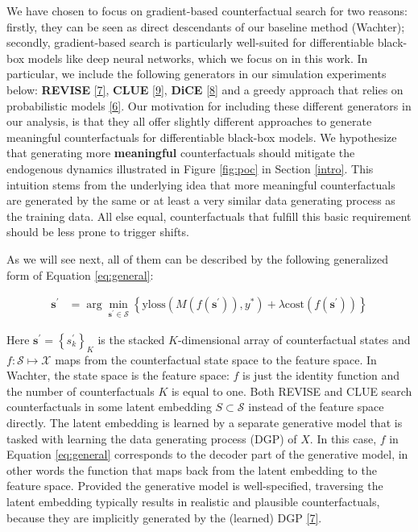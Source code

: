 \documentclass[conference,final,]{IEEEtran}
\theoremstyle{definition}
\theoremstyle{definition}
\theoremstyle{definition}
\theoremstyle{definition}
\theoremstyle{remark}
\begin{document}
We have chosen to focus on gradient-based counterfactual search for two reasons: firstly, they can be seen as direct descendants of our baseline method (Wachter); secondly, gradient-based search is particularly well-suited for differentiable black-box models like deep neural networks, which we focus on in this work. In particular, we include the following generators in our simulation experiments below: \textbf{REVISE} \protect\hyperlink{ref-joshi2019realistic}{{[}7{]}}, \textbf{CLUE} \protect\hyperlink{ref-antoran2020getting}{{[}9{]}}, \textbf{DiCE} \protect\hyperlink{ref-mothilal2020explaining}{{[}8{]}} and a greedy approach that relies on probabilistic models \protect\hyperlink{ref-schut2021generating}{{[}6{]}}. Our motivation for including these different generators in our analysis, is that they all offer slightly different approaches to generate meaningful counterfactuals for differentiable black-box models. We hypothesize that generating more \textbf{meaningful} counterfactuals should mitigate the endogenous dynamics illustrated in Figure \ref{fig:poc} in Section \ref{intro}. This intuition stems from the underlying idea that more meaningful counterfactuals are generated by the same or at least a very similar data generating process as the training data. All else equal, counterfactuals that fulfill this basic requirement should be less prone to trigger shifts.

As we will see next, all of them can be described by the following generalized form of Equation \eqref{eq:general}:

\begin{equation}
\begin{aligned}
\mathbf{s}^\prime &= \arg \min_{\mathbf{s}^\prime \in \mathcal{S}} \left\{  {\text{yloss}(M(f(\mathbf{s}^\prime)),y^*)}+ \lambda {\text{cost}(f(\mathbf{s}^\prime)) }  \right\} \label{eq:general}
\end{aligned} 
\end{equation}

Here \(\mathbf{s}^\prime=\left\{s_k^\prime\right\}_K\) is the stacked \(K\)-dimensional array of counterfactual states and \(f: \mathcal{S} \mapsto \mathcal{X}\) maps from the counterfactual state space to the feature space. In Wachter, the state space is the feature space: \(f\) is just the identity function and the number of counterfactuals \(K\) is equal to one. Both REVISE and CLUE search counterfactuals in some latent embedding \(S \subset \mathcal{S}\) instead of the feature space directly. The latent embedding is learned by a separate generative model that is tasked with learning the data generating process (DGP) of \(X\). In this case, \(f\) in Equation \eqref{eq:general} corresponds to the decoder part of the generative model, in other words the function that maps back from the latent embedding to the feature space. Provided the generative model is well-specified, traversing the latent embedding typically results in realistic and plausible counterfactuals, because they are implicitly generated by the (learned) DGP \protect\hyperlink{ref-joshi2019realistic}{{[}7{]}}.
\end{document}
